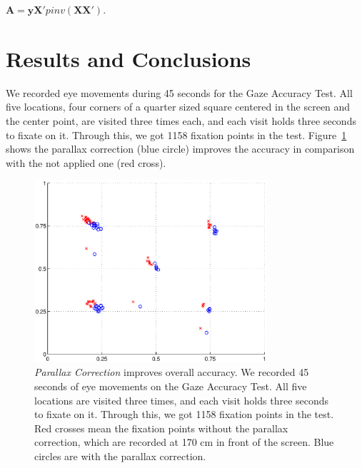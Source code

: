 \documentclass{article}
\begin{document}
\begin{center}
$\mathbf{A} = \mathbf{yX'}pinv(\mathbf{XX'})$.
\end{center}



\section{Results and Conclusions}

We recorded eye movements during 45 seconds for the Gaze Accuracy Test. All five locations, four corners of a quarter sized square centered in the screen and the center point, are visited three times each, and each visit holds three seconds to fixate on it. Through this, we got 1158 fixation points in the test. Figure~\ref{fig:parallax-correction} shows the parallax correction (blue circle) improves the accuracy in comparison with the not applied one (red cross).

\begin{figure}
  \centerline{\includegraphics[width=86mm,trim=10mm 10mm 10mm 10mm]{./eps/parallax_correction.eps}}
  \caption{\textit{Parallax Correction} improves overall accuracy. We recorded 45 seconds of eye movements on the Gaze Accuracy Test. All five locations are visited three times, and each visit holds three seconds to fixate on it. Through this, we got 1158 fixation points in the test. Red crosses mean the fixation points without the parallax correction, which are recorded at 170 cm in front of the screen. Blue circles are with the parallax correction.}
  \label{fig:parallax-correction}
\end{figure}


\end{document}
